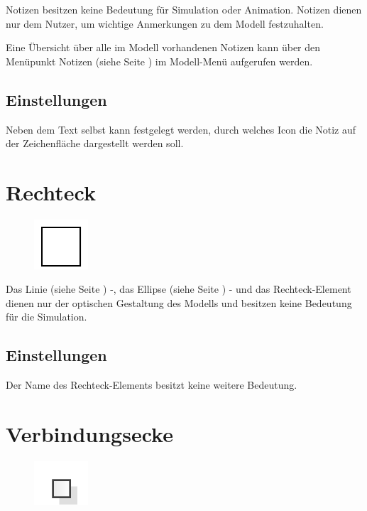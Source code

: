 Notizen besitzen keine Bedeutung für Simulation oder Animation.
Notizen dienen nur dem Nutzer, um wichtige Anmerkungen zu dem Modell festzuhalten.

Eine Übersicht über alle im Modell vorhandenen Notizen kann über
den Menüpunkt Notizen (siehe Seite \pageref{ref:Notes}) im Modell-Menü
aufgerufen werden.

\subsection*{Einstellungen}

Neben dem Text selbst kann festgelegt werden, durch welches Icon die
Notiz auf der Zeichenfläche dargestellt werden soll.


\section{Rechteck}
\label{ref:ModelElementRectangle}

\begin{figure}
\vspace{-22pt}
\includegraphics[width=2cm]{imageModelElementRectangle.png}
\vspace{-22pt}
\end{figure}

Das Linie (siehe Seite \pageref{ref:ModelElementLine}) -, das Ellipse (siehe Seite \pageref{ref:ModelElementEllipse}) - und
das Rechteck-Element dienen nur der optischen Gestaltung des Modells und besitzen keine Bedeutung für die Simulation.

\subsection*{Einstellungen}

Der Name des Rechteck-Elements besitzt keine weitere Bedeutung.


\section{Verbindungsecke}
\label{ref:ModelElementVertex}

\begin{figure}
\vspace{-22pt}
\includegraphics[width=2cm]{imageModelElementVertex.png}
\vspace{-22pt}
\end{figure}

